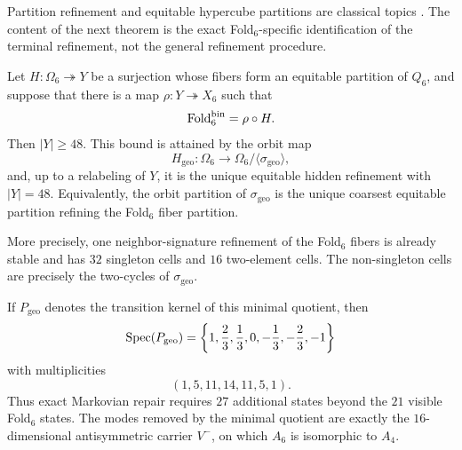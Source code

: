 Partition refinement and equitable hypercube partitions are classical topics
\cite{krebs2015universal,hyun2015harmonic}.  The content of the next theorem is
the exact Fold\(_6\)-specific identification of the terminal refinement, not
the general refinement procedure.

\begin{theorem}\label{thm:window6-minimal-equitable-refinement}
Let \(H:\Omega_6\twoheadrightarrow Y\) be a surjection whose fibers form an
equitable partition of \(Q_6\), and suppose that there is a map
\(\rho:Y\twoheadrightarrow X_6\) such that
\[
\operatorname{Fold}_6^{\mathrm{bin}}=\rho\circ H.
\]
Then \(|Y|\ge48\).  This bound is attained by the orbit map
\[
H_{\mathrm{geo}}:\Omega_6\longrightarrow
\Omega_6/\langle\sigma_{\mathrm{geo}}\rangle,
\]
and, up to a relabeling of \(Y\), it is the unique equitable hidden refinement
with \(|Y|=48\).  Equivalently, the orbit partition of
\(\sigma_{\mathrm{geo}}\) is the unique coarsest equitable partition refining
the Fold\(_6\) fiber partition.

More precisely, one neighbor-signature refinement of the Fold\(_6\) fibers is
already stable and has \(32\) singleton cells and \(16\) two-element cells.
The non-singleton cells are precisely the two-cycles of
\(\sigma_{\mathrm{geo}}\).

If \(P_{\mathrm{geo}}\) denotes the transition kernel of this minimal quotient,
then
\[
\operatorname{Spec}(P_{\mathrm{geo}})=
\left\{1,\frac23,\frac13,0,-\frac13,-\frac23,-1\right\}
\]
with multiplicities
\[
(1,5,11,14,11,5,1).
\]
Thus exact Markovian repair requires \(27\) additional states beyond the
\(21\) visible Fold\(_6\) states.  The modes removed by the minimal quotient
are exactly the \(16\)-dimensional antisymmetric carrier \(V^-\), on which
\(A_6\) is isomorphic to \(A_4\).
\end{theorem}

